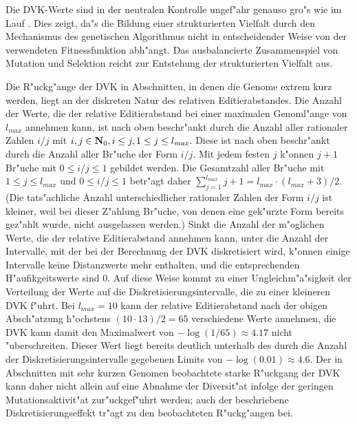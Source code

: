 Die DVK-Werte sind in der neutralen Kontrolle ungef"ahr genauso gro"s wie im Lauf .
Dies zeigt, da"s die Bildung einer strukturierten Vielfalt durch den Mechanismus des genetischen
Algorithmus nicht in entscheidender Weise von der verwendeten Fitnessfunktion abh"angt. Das ausbalancierte
Zusammenspiel von Mutation und Selektion reicht zur Entstehung der strukturierten Vielfalt aus.

Die R"uckg"ange der DVK in Abschnitten, in denen die Genome extrem kurz werden, liegt an der
diskreten Natur des relativen Editierabstandes. Die Anzahl der Werte, die der relative Editierabstand
bei einer maximalen Genoml"ange von $l_{\mathit{max}}$ annehmen kann, ist nach oben beschr"ankt durch die
Anzahl aller rationaler Zahlen $i/j$ mit $i, j \in \mbox{\bfseries N}_0, i \leq j, 1 \leq j \leq l_{\mathit{max}}$.
Diese ist nach oben beschr"ankt durch die Anzahl aller Br"uche der Form $i/j$. Mit jedem festen $j$ k"onnen
$j+1$ Br"uche mit $0 \leq i/j \leq 1$ gebildet werden. Die Gesamtzahl aller Br"uche mit $1 \leq j \leq l_{\mathit{max}}$
und $0 \leq i/j \leq 1$ betr"agt daher $\sum_{j=1}^{l_{\mathit{max}}}j+1 = l_{\mathit{max}} \cdot (l_{\mathit{max}}+3) / 2$.
(Die tats"achliche Anzahl unterschiedlicher rationaler
Zahlen der Form $i/j$ ist kleiner, weil bei dieser Z"ahlung Br"uche, von denen eine gek"urzte Form bereits
gez"ahlt wurde, nicht ausgelassen werden.) Sinkt die Anzahl der m"oglichen Werte, die
der relative Editierabstand annehmen kann, unter die Anzahl der Intervalle, mit der bei der Berechnung
der DVK diskretisiert wird, k"onnen einige Intervalle keine Distanzwerte mehr enthalten, und die entsprechenden
H"aufikgeitswerte sind 0. Auf diese Weise kommt zu
einer Ungleichm"a"sigkeit der Verteilung der Werte auf die Diskretisierungsintervalle, die zu einer kleineren
DVK f"uhrt. Bei $l_{\mathit{max}}=10$ kann der relative Editierabstand nach der obigen Absch"atzung h"ochstens
$(10 \cdot 13)/2 = 65$ verschiedene Werte annehmen, die DVK kann damit den Maximalwert von $-\log(1/65) \approx 4.17$
nicht "uberschreiten. Dieser Wert liegt bereits deutlich unterhalb des durch die Anzahl der Diskretisierungsintervalle
gegebenen Limits von $-\log(0.01) \approx 4.6$.
Der in Abschnitten mit sehr kurzen Genomen beobachtete starke R"uckgang
der DVK kann daher nicht allein auf eine Abnahme der Diversit"at infolge der geringen Mutationsaktivit"at zur"uckgef"uhrt
werden; auch der beschriebene Diskretisierungseffekt tr"agt zu den beobachteten R"uckg"angen bei.




